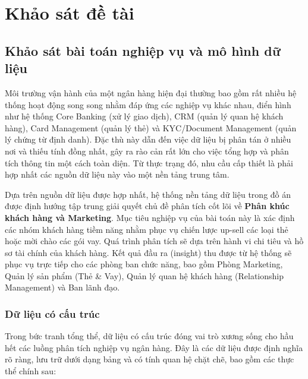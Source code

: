 \chapter{Khảo sát đề tài}
\label{ch:survey}

\section{Khảo sát bài toán nghiệp vụ và mô hình dữ liệu}

Môi trường vận hành của một ngân hàng hiện đại thường bao gồm rất nhiều hệ thống hoạt động song song nhằm đáp ứng các nghiệp vụ khác nhau, điển hình như hệ thống Core Banking (xử lý giao dịch), CRM (quản lý quan hệ khách hàng), Card Management (quản lý thẻ) và KYC/Document Management (quản lý chứng từ định danh). Đặc thù này dẫn đến việc dữ liệu bị phân tán ở nhiều nơi và thiếu tính đồng nhất, gây ra rào cản rất lớn cho việc tổng hợp và phân tích thông tin một cách toàn diện. Từ thực trạng đó, nhu cầu cấp thiết là phải hợp nhất các nguồn dữ liệu này vào một nền tảng trung tâm. 

Dựa trên nguồn dữ liệu được hợp nhất, hệ thống nền tảng dữ liệu trong đồ án được định hướng tập trung giải quyết chủ đề phân tích cốt lõi về \textbf{Phân khúc khách hàng và Marketing}. Mục tiêu nghiệp vụ của bài toán này là xác định các nhóm khách hàng tiềm năng nhằm phục vụ chiến lược up-sell các loại thẻ hoặc mời chào các gói vay. Quá trình phân tích sẽ dựa trên hành vi chi tiêu và hồ sơ tài chính của khách hàng. Kết quả đầu ra (insight) thu được từ hệ thống sẽ phục vụ trực tiếp cho các phòng ban chức năng, bao gồm Phòng Marketing, Quản lý sản phẩm (Thẻ \& Vay), Quản lý quan hệ khách hàng (Relationship Management) và Ban lãnh đạo.
\subsection{Dữ liệu có cấu trúc}

Trong bức tranh tổng thể, dữ liệu có cấu trúc đóng vai trò xương sống cho hầu hết các luồng phân tích nghiệp vụ ngân hàng. Đây là các dữ liệu được định nghĩa rõ ràng, lưu trữ dưới dạng bảng và có tính quan hệ chặt chẽ, bao gồm các thực thể chính sau:

